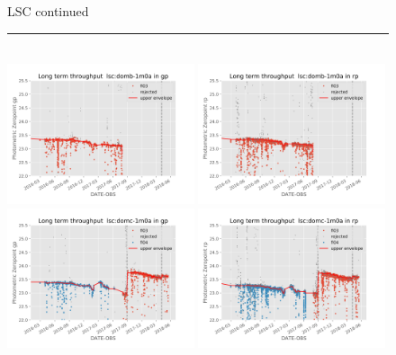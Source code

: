 \documentclass[draft]{spieman}
\begin{document}
\begin{figure}\ContinuedFloat
\centering 
LSC continued \\ 
\rule{\textwidth}{0.4pt} \\
\includegraphics[width=0.49\textwidth]{images/photzptrend-lsc-domb-1m0a-gp.png} \hspace*{\fill}
\includegraphics[width=0.49\textwidth]{images/photzptrend-lsc-domb-1m0a-rp.png} \\
\includegraphics[width=0.49\textwidth]{images/photzptrend-lsc-domc-1m0a-gp.png} \hspace*{\fill}
\includegraphics[width=0.49\textwidth]{images/photzptrend-lsc-domc-1m0a-rp.png} \\[1ex]

\end{figure}
\end{document}
